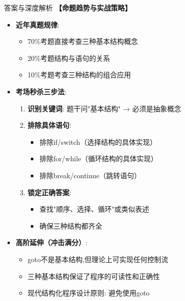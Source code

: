 \documentclass[a4paper,12pt]{article}
\begin{document}
\begin{bluebox}{答案与深度解析}
	\textbf{【命题趋势与实战策略】}
	\begin{itemize}[leftmargin=*, nosep]
		\item \textbf{近年真题规律}:
		      \begin{itemize}
			      \item 70\%考题直接考查三种基本结构概念
			      \item 20\%考题结构与语句的关系
			      \item 10\%考题考查三种结构的组合应用
		      \end{itemize}

		\item \textbf{考场秒杀三步法}:
		      \begin{enumerate}
			      \item \textbf{识别关键词}: 题干问"基本结构" → 必须是抽象概念
			      \item \textbf{排除具体语句}:
			            \begin{itemize}
				            \item 排除if/switch（选择结构的具体实现）
				            \item 排除for/while（循环结构的具体实现）
				            \item 排除break/continue（跳转语句）
			            \end{itemize}
			      \item \textbf{锁定正确答案}:
			            \begin{itemize}
				            \item 查找"顺序、选择、循环"或类似表述
				            \item 确保三种结构都齐全
			            \end{itemize}
		      \end{enumerate}

		\item \textbf{高阶延伸（冲击满分）}:
		      \begin{itemize}
			      \item goto不是基本结构,但理论上可实现任何控制流
			      \item 三种基本结构保证了程序的可读性和正确性
			      \item 现代结构化程序设计原则: 避免使用goto
		      \end{itemize}
	\end{itemize}
\end{bluebox}

\vspace{1cm}
\end{document}

